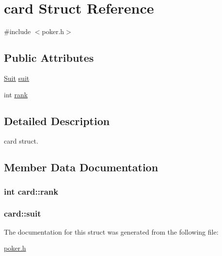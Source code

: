 \hypertarget{structcard}{\section{card Struct Reference}
\label{structcard}
}


{\ttfamily \#include $<$poker.\+h$>$}

\subsection*{Public Attributes}
\begin{DoxyCompactItemize}
\item 
\hyperlink{poker_8h_a2b1ea04090b8ece69f59a1f89b5ef903}{Suit} \hyperlink{structcard_a3f809473f93b4046f53540be5938d593}{suit}
\item 
int \hyperlink{structcard_ae355921876ab9466544d9971bbc6821b}{rank}
\end{DoxyCompactItemize}


\subsection{Detailed Description}
card struct. 

\subsection{Member Data Documentation}
\hypertarget{structcard_ae355921876ab9466544d9971bbc6821b}{
\subsubsection[{rank}]{\setlength{\rightskip}{0pt plus 5cm}int card\+::rank}}\label{structcard_ae355921876ab9466544d9971bbc6821b}
\hypertarget{structcard_a3f809473f93b4046f53540be5938d593}{
\subsubsection[{suit}]{ card\+::suit}}\label{structcard_a3f809473f93b4046f53540be5938d593}


The documentation for this struct was generated from the following file\+:\begin{DoxyCompactItemize}
\item 
\hyperlink{poker_8h}{poker.\+h}\end{DoxyCompactItemize}
